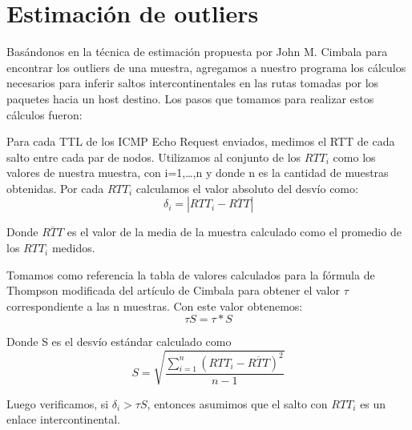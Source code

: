 \section{Estimación de outliers}

Basándonos en la técnica de estimación propuesta por John M. Cimbala para encontrar los outliers de una muestra, agregamos a nuestro programa los cálculos necesarios para inferir saltos intercontinentales en las rutas tomadas por los paquetes hacia un host destino.
Los pasos que tomamos para realizar estos cálculos fueron:

Para cada TTL de los ICMP Echo Request enviados, medimos el RTT de cada salto entre cada par de nodos. Utilizamos al conjunto de los $RTT_i$ como los valores de nuestra muestra, con i=1,…,n y donde n es la cantidad de muestras obtenidas.
Por cada $RTT_i$ calculamos el valor absoluto del desvío como:
\[
\delta_i = |RTT_i - \overline{RTT}|
\]

Donde $\overline{RTT}$ es el valor de la media de la muestra calculado como el promedio de los $RTT_i$ medidos.

Tomamos como referencia la tabla de valores calculados para la fórmula de Thompson modificada del artículo de Cimbala para obtener el valor  $\tau$ correspondiente a las n muestras. Con este valor obtenemos:
\[
\tau S = \tau * S
\]

Donde S es el desvío estándar calculado como
\[
S=\sqrt{\frac{\sum_{i=1}^{n} (RTT_i - \overline{RTT})^2}{n-1}}
\]

Luego verificamos, si $\delta_i > \tau S$, entonces asumimos que el salto con $RTT_i$ es un enlace intercontinental.